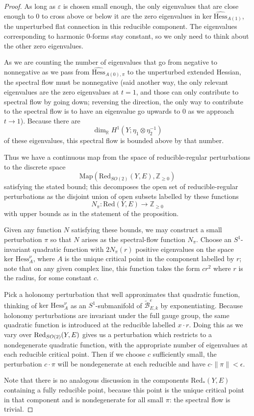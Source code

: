 \documentclass[10pt,a4paper]{amsart}
\theoremstyle{definition}
\theoremstyle{remark}
\numberwithin{figure}{qchap}
\begin{document}
\begin{proof}
As long as $\varepsilon$ is chosen small enough, the only eigenvalues that are close enough to $0$ to cross above or below it are the zero eigenvalues in $\text{ker}\;\widehat{\text{Hess}}_{A(1)}$, the unperturbed flat connection in this reducible component. The eigenvalues corresponding to harmonic $0$-forms stay constant, so we only need to think about the other zero eigenvalues.

As we are counting the number of eigenvalues that go from negative to nonnegative as we pass from $\widehat{\text{Hess}}_{A(0),\pi}$ to the unperturbed extended Hessian, the spectral flow must be nonnegative (said another way, the only relevant eigenvalues are the zero eigenvalues at $t = 1$, and those can only contribute to spectral flow by going down; reversing the direction, the only way to contribute to the spectral flow is to have an eigenvalue go upwards to $0$ as we approach $t \to 1$). Because there are 
$$\dim_{\mathbb R} H^1\left(Y; \eta_1 \otimes \eta_2^{-1}\right)$$ 
of these eigenvalues, this spectral flow is bounded above by that number.

Thus we have a continuous map from the space of reducible-regular perturbations to the discrete space $$\text{Map}(\text{Red}_{SO(2)}(Y,E), \mathbb Z_{\geq 0})$$ 
satisfying the stated bound; this decomposes the open set of reducible-regular perturbations as the disjoint union of open subsets labelled by these functions 
$$N_\pi: \text{Red}(Y, E) \to \mathbb Z_{\geq 0}$$ 
with upper bounds as in the statement of the proposition.

Given any function $N$ satisfying these bounds, we may construct a small perturbation $\pi$ so that $N$ arises as the spectral-flow function $N_\pi$. Choose an $S^1$-invariant quadratic function with $2N_\pi(r)$ positive eigenvalues on the space $\text{ker } \text{Hess}^\nu_A$, where $A$ is the unique critical point in the component labelled by $r$; note that on any given complex line, this function takes the form $cr^2$ where $r$ is the radius, for some constant $c$. 

Pick a holonomy perturbation that well approximates that quadratic function, thinking of $\text{ker } \text{Hess}^\nu_A$ as an $S^1$-submanifold of $\widetilde{\mathcal B}^e_{E,k}$ by exponentiating. Because holonomy perturbations are invariant under the full gauge group, the same quadratic function is introduced at the reducible labelled $x \cdot r$. Doing this as we vary over $\textup{Red}_{SO(2)}(Y,E)$ gives us a perturbation which restricts to a nondegenerate quadratic function, with the appropriate number of eigenvalues at each reducible critical point. Then if we choose $c$ sufficiently small, the perturbation $c \cdot \pi$ will be nondegenerate at each reducible and have $c \cdot \|\pi\| < \epsilon$.

Note that there is no analogous discussion in the components $\text{Red}_*(Y,E)$ containing a fully reducible point, because this point is the unique critical point in that component and is nondegenerate for all small $\pi$: the spectral flow is trivial.
\end{proof}
\end{document}
